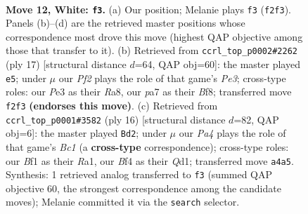 \documentclass[11pt]{article}
\begin{document}
\clearpage

\begin{figure}[p]\centering
\begin{subfigure}{0.46\textwidth}\centering
\resizebox{\linewidth}{!}{%
\newchessgame
\chessboard[
  setfen={rnbqr1k1/pp2bppp/2p5/3p4/P2P1Bn1/1PN1P3/2Q1NPPP/R3KB1R w KQ - 1 12},
  showmover=false,
  pgfstyle=straightmove, color=movearrow, markmove={f2-f3}
]}
\caption{}
\end{subfigure}\hfill
\begin{subfigure}{0.46\textwidth}\centering
\resizebox{\linewidth}{!}{%
\newchessgame
\chessboard[
  setfen={r1b1kb1r/1pqn1ppp/p2ppn2/P7/3NPP2/2N1B3/1PP3PP/R2QKB1R b KQkq - 0 9},
  showmover=false,
  pgfstyle=straightmove, color=movearrow, markmove={e6-e5}
]}
\caption{}
\end{subfigure}
\\[4pt]
\begin{subfigure}{0.46\textwidth}\centering
\resizebox{\linewidth}{!}{%
\newchessgame
\chessboard[
  setfen={r1bqk2r/pp1n1ppp/2n1p3/3pP3/1b1P1P2/8/PP2N1PP/R1BQKBNR w KQkq - 1 9},
  showmover=false,
  pgfstyle=straightmove, color=movearrow, markmove={c1-d2}
]}
\caption{}
\end{subfigure}\hfill

\caption{\textbf{Move 12, White: \texttt{f3}.} (a) Our position; Melanie plays \texttt{f3} (\texttt{f2f3}). Panels (b)--(d) are the retrieved master positions whose correspondence most drove this move (highest QAP objective among those that transfer to it). (b) Retrieved from \texttt{ccrl\_top\_p0002\#2262} (ply 17) [structural distance $d$=64, QAP obj=60]: the master played \texttt{e5}; under $\mu$ our \emph{Pf2} plays the role of that game's \emph{Pe3}; cross-type roles: our \emph{P}e3 as their \emph{R}a8, our \emph{p}a7 as their \emph{B}f8; transferred move \texttt{f2f3} \textbf{(endorses this move)}. (c) Retrieved from \texttt{ccrl\_top\_p0001\#3582} (ply 16) [structural distance $d$=82, QAP obj=6]: the master played \texttt{Bd2}; under $\mu$ our \emph{Pa4} plays the role of that game's \emph{Bc1} (a \textbf{cross-type} correspondence); cross-type roles: our \emph{B}f1 as their \emph{R}a1, our \emph{B}f4 as their \emph{Q}d1; transferred move \texttt{a4a5}. Synthesis: 1 retrieved analog transferred to \texttt{f3} (summed QAP objective 60, the strongest correspondence among the candidate moves); Melanie committed it via the \texttt{search} selector.}
\label{fig:thought-m22}
\end{figure}
\end{document}
